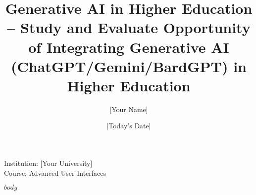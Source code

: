 \documentclass{article}
\begin{document}
\title{Generative AI in Higher Education – Study and Evaluate Opportunity of Integrating Generative AI (ChatGPT/Gemini/BardGPT) in Higher Education}
\author{[Your Name]}
\date{[Today's Date]}

\maketitle

\begin{center}
\large
Institution: [Your University] \\
Course: Advanced User Interfaces
\end{center}

\begin{multicols}{2}
$body$
\end{multicols}
\end{document}
